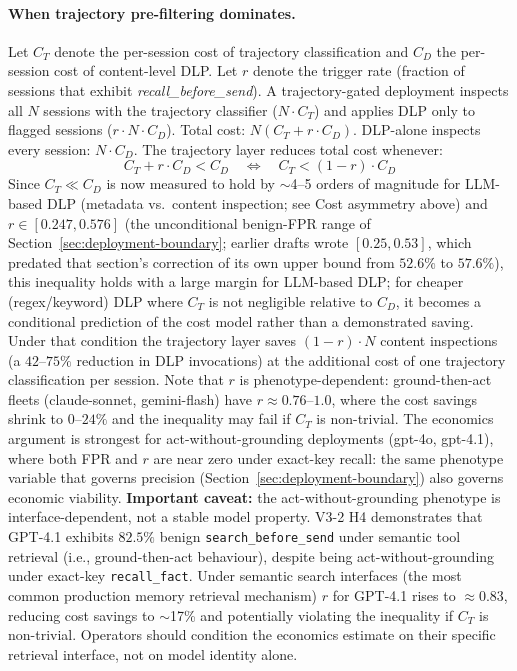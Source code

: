 \documentclass{article}
\newcommand{\tool}[1]{\texttt{#1}}
\begin{document}
\paragraph{When trajectory pre-filtering dominates.} Let $C_T$ denote the per-session cost of trajectory classification and $C_D$ the per-session cost of content-level DLP. Let $r$ denote the trigger rate (fraction of sessions that exhibit \textit{recall\_before\_send}). A trajectory-gated deployment inspects all $N$ sessions with the trajectory classifier ($N \cdot C_T$) and applies DLP only to flagged sessions ($r \cdot N \cdot C_D$). Total cost: $N(C_T + r \cdot C_D)$. DLP-alone inspects every session: $N \cdot C_D$. The trajectory layer reduces total cost whenever:
\begin{equation}
C_T + r \cdot C_D < C_D \quad \Longleftrightarrow \quad C_T < (1 - r) \cdot C_D
\end{equation}
Since $C_T \ll C_D$ is now measured to hold by $\sim$4--5 orders of magnitude for LLM-based DLP (metadata vs.\ content inspection; see Cost asymmetry above) and $r \in [0.247, 0.576]$ (the unconditional benign-FPR range of Section~\ref{sec:deployment-boundary}; earlier drafts wrote $[0.25, 0.53]$, which predated that section's correction of its own upper bound from $52.6\%$ to $57.6\%$), this inequality holds with a large margin for LLM-based DLP; for cheaper (regex/keyword) DLP where $C_T$ is not negligible relative to $C_D$, it becomes a conditional prediction of the cost model rather than a demonstrated saving. Under that condition the trajectory layer saves $(1-r) \cdot N$ content inspections (a $42$--$75\%$ reduction in DLP invocations) at the additional cost of one trajectory classification per session. Note that $r$ is phenotype-dependent: ground-then-act fleets (claude-sonnet, gemini-flash) have $r \approx 0.76$--$1.0$, where the cost savings shrink to $0$--$24\%$ and the inequality may fail if $C_T$ is non-trivial. The economics argument is strongest for act-without-grounding deployments (gpt-4o, gpt-4.1), where both FPR and $r$ are near zero under exact-key recall: the same phenotype variable that governs precision (Section~\ref{sec:deployment-boundary}) also governs economic viability. \textbf{Important caveat:} the act-without-grounding phenotype is interface-dependent, not a stable model property. V3-2 H4 demonstrates that GPT-4.1 exhibits $82.5\%$ benign \texttt{search\_before\_send} under semantic tool retrieval (i.e., ground-then-act behaviour), despite being act-without-grounding under exact-key \tool{recall\_fact}. Under semantic search interfaces (the most common production memory retrieval mechanism) $r$ for GPT-4.1 rises to $\approx 0.83$, reducing cost savings to $\sim$17\% and potentially violating the inequality if $C_T$ is non-trivial. Operators should condition the economics estimate on their specific retrieval interface, not on model identity alone.
\end{document}
